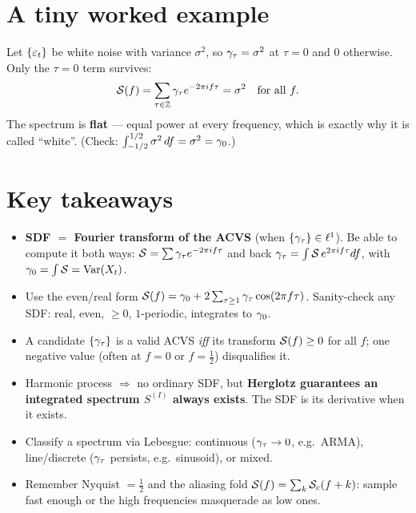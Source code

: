 \documentclass[11pt]{article}
\begin{document}
\section*{A tiny worked example}

\begin{exmpl}
Let $\{\varepsilon_t\}$ be white noise with variance $\sigma^2$, so $\gamma_\tau=\sigma^2$ at $\tau=0$ and $0$ otherwise. Only the $\tau=0$ term survives:
\[
\mathcal{S}(f)=\sum_{\tau\in\mathbb{Z}}\gamma_\tau e^{-2\pi i f\tau}=\sigma^2\quad\text{for all }f .
\]
The spectrum is \textbf{flat} --- equal power at every frequency, which is exactly why it is called ``white''. (Check: $\int_{-1/2}^{1/2}\sigma^2\,df=\sigma^2=\gamma_0$.)
\end{exmpl}

\section*{Key takeaways}

\begin{retenir}
\begin{itemize}
  \item \textbf{SDF $=$ Fourier transform of the ACVS} (when $\{\gamma_\tau\}\in\ell^1$). Be able to compute it both ways: $\mathcal{S}=\sum\gamma_\tau e^{-2\pi i f\tau}$ and back $\gamma_\tau=\int\mathcal{S}\,e^{2\pi i f\tau}df$, with $\gamma_0=\int\mathcal{S}=\operatorname{Var}(X_t)$.
  \item Use the even/real form $\mathcal{S}(f)=\gamma_0+2\sum_{\tau\ge1}\gamma_\tau\cos(2\pi f\tau)$. Sanity-check any SDF: real, even, $\ge0$, $1$-periodic, integrates to $\gamma_0$.
  \item A candidate $\{\gamma_\tau\}$ is a valid ACVS \emph{iff} its transform $\mathcal{S}(f)\ge0$ for all $f$; one negative value (often at $f=0$ or $f=\tfrac12$) disqualifies it.
  \item Harmonic process $\Rightarrow$ no ordinary SDF, but \textbf{Herglotz guarantees an integrated spectrum $S^{(I)}$ always exists}. The SDF is its derivative when it exists.
  \item Classify a spectrum via Lebesgue: continuous ($\gamma_\tau\to0$, e.g.\ ARMA), line/discrete ($\gamma_\tau$ persists, e.g.\ sinusoid), or mixed.
  \item Remember Nyquist $=\tfrac12$ and the aliasing fold $\mathcal{S}(f)=\sum_k\mathcal{S}_c(f+k)$: sample fast enough or the high frequencies masquerade as low ones.
\end{itemize}
\end{retenir}
\end{document}
